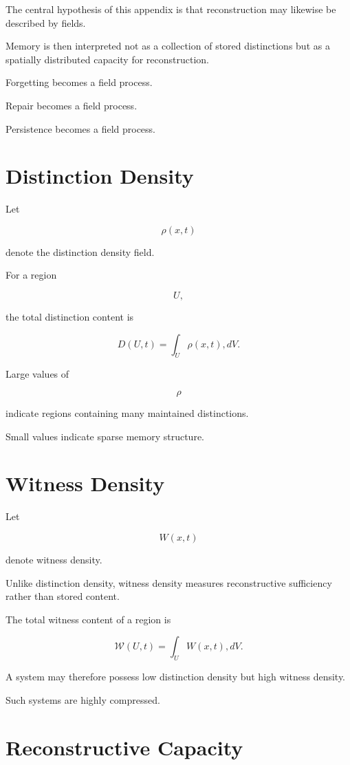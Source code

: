 \documentclass[12pt,oneside]{book}
\theoremstyle{plain} \newtheorem{theorem}{Theorem}[chapter] \newtheorem{lemma}[theorem]{Lemma} \newtheorem{proposition}[theorem]{Proposition} \newtheorem{corollary}[theorem]{Corollary}
\theoremstyle{definition} \newtheorem{definition}[theorem]{Definition} \newtheorem{axiom}[theorem]{Axiom} \newtheorem{construction}[theorem]{Construction}
\theoremstyle{remark} \newtheorem{remark}[theorem]{Remark} \newtheorem{example}[theorem]{Example}
\begin{document}
The central hypothesis of this appendix is that reconstruction may likewise be described by fields.

Memory is then interpreted not as a collection of stored distinctions but as a spatially distributed capacity for reconstruction.

Forgetting becomes a field process.

Repair becomes a field process.

Persistence becomes a field process.

\section{Distinction Density}

Let

\[
\rho(x,t)
\]

denote the distinction density field.

For a region

\[
U,
\]

the total distinction content is

\[
D(U,t)
=
\int_U
\rho(x,t),dV.
\]

Large values of

\[
\rho
\]

indicate regions containing many maintained distinctions.

Small values indicate sparse memory structure.

\section{Witness Density}

Let

\[
W(x,t)
\]

denote witness density.

Unlike distinction density, witness density measures reconstructive sufficiency rather than stored content.

The total witness content of a region is

\[
\mathcal W(U,t)
=
\int_U
W(x,t),dV.
\]

A system may therefore possess low distinction density but high witness density.

Such systems are highly compressed.

\section{Reconstructive Capacity}
\end{document}
